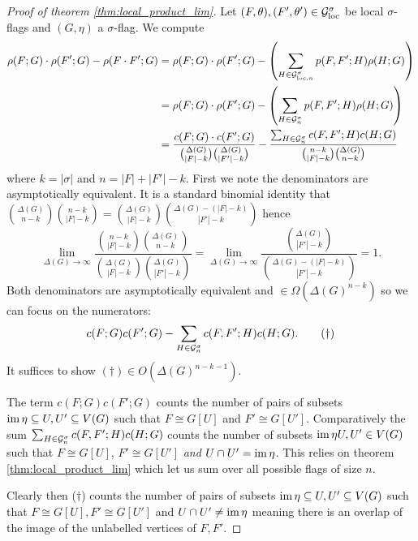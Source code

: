 \begin{proof}[Proof of theorem \ref{thm:local_product_lim}]
    Let $(F,\theta), (F',\theta') \in\mathcal{G}_\mathrm{loc}^\sigma$ be local $\sigma$-flags and $(G,\eta)$ a
    $\sigma$-flag. We compute
    \[
        \begin{split}
            \rho(F; G)\cdot\rho(F';G) -\rho(F\cdot F'; G)
            &= \rho(F; G)\cdot\rho(F';G)
                - \left(\sum_{H\in\mathcal{G}_{\mathrm{loc},n}^\sigma} p(F, F'; H)\rho(H; G) \right)\\
            &= \rho(F; G)\cdot\rho(F';G)
                - \left(\sum_{H\in\mathcal{G}_n^\sigma} p(F, F'; H)\rho(H; G) \right)\\
            &= \frac{c(F; G)\cdot c(F';G)}{\binom{\Delta(G)}{|F|-k}\binom{\Delta(G)}{|F'|-k}}
                - \frac{\sum_{H\in\mathcal{G}^\sigma_n} c(F, F'; H)c(H; G)}
                {\binom{n-k}{|F|-k}\binom{\Delta(G)}{n-k}}
            \end{split}
    \]
    where $k=|\sigma|$ and $n=|F|+|F'|-k$.
    First we note the denominators are asymptotically equivalent. It is a standard
    binomial identity that
    $\binom{\Delta(G)}{n-k}\binom{n-k}{|F|-k} = \binom{\Delta(G)}{|F|-k}\binom{\Delta(G)-(|F|-k)}{|F'|-k}$
    hence
    \[
        \lim_{\Delta(G)\to\infty}
        \frac{\binom{n-k}{|F|-k}\binom{\Delta(G)}{n-k}}{\binom{\Delta(G)}{|F|-k}\binom{\Delta(G)}{|F'|-k}}
        = \lim_{\Delta(G)\to\infty}
        \frac{\binom{\Delta(G)}{|F'|-k}}{\binom{\Delta(G)-(|F|-k)}{|F'|-k}}
        = 1.
    \]
    Both denominators are asymptotically equivalent and $\in\Omega(\Delta(G)^{n-k})$ so we
    can focus on the numerators:
    \[
        c(F;G)c(F';G) - \sum_{H\in\mathcal{G}^\sigma_n}c(F,F';H)c(H;G).
        \tag{$\dagger$}
    \]
    It suffices to show $(\dagger) \in O(\Delta(G)^{n-k-1})$.

    The term $c(F; G)c(F';G)$ counts the number of pairs of subsets
    $\operatorname{im}\eta \subseteq U, U' \subseteq V(G)$ such that $F \cong G[U]$ and $F'\cong G[U']$.
    Comparatively the sum $\sum_{H\in\mathcal{G}^\sigma_n} c(F, F'; H)c(H; G)$ counts the number
    of subsets $\operatorname{im}\eta U, U' \in V(G)$ such that $F\cong G[U]$, $F'\cong G[U']$ \textit{and}
    $U \cap U' = \operatorname{im} \eta$. This relies on theorem \ref{thm:local_product_lim}
    which let us sum over all possible flags of size $n$.

    Clearly then ($\dagger$) counts the
    number of pairs of subsets $\operatorname{im}\eta \subseteq U, U' \subseteq V(G)$ such that
    $F \cong G[U], F'\cong G[U']$ and $U \cap U' \neq \operatorname{im} \eta$ meaning there is
    an overlap of the image of the unlabelled vertices of $F, F'$.


\end{proof}
